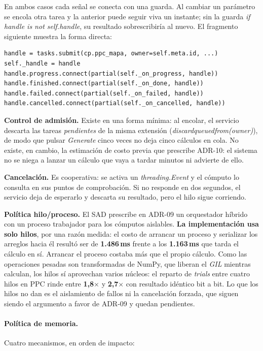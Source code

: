 \documentclass[12pt,letterpaper,oneside]{article}
\DeclareRobustCommand{\_}{\textunderscore\allowbreak}
\begin{document}
En ambos casos cada señal se conecta con una guarda. Al cambiar un parámetro se encola otra tarea y la anterior puede seguir viva un instante; sin la guarda \textit{if handle is not self.\_handle}, su resultado sobrescribiría al nuevo. El fragmento siguiente muestra la forma directa:

\begin{verbatim}
handle = tasks.submit(cp.ppc_mapa, owner=self.meta.id, ...)
self._handle = handle
handle.progress.connect(partial(self._on_progress, handle))
handle.finished.connect(partial(self._on_done, handle))
handle.failed.connect(partial(self._on_failed, handle))
handle.cancelled.connect(partial(self._on_cancelled, handle))
\end{verbatim}

\textbf{Control de admisión.} Existe en una forma mínima: al encolar, el servicio descarta las tareas \textit{pendientes} de la misma extensión (\textit{\textunderscore{}discard\_queued\_from(owner)}), de modo que pulsar \textit{Generate} cinco veces no deja cinco cálculos en cola. No existe, en cambio, la estimación de costo previa que prescribe ADR-10: el sistema no se niega a lanzar un cálculo que vaya a tardar minutos ni advierte de ello.

\textbf{Cancelación.} Es cooperativa: se activa un \textit{threading.Event} y el cómputo lo consulta en sus puntos de comprobación. Si no responde en dos segundos, el servicio deja de esperarlo y descarta su resultado, pero el hilo sigue corriendo.

\textbf{Política hilo/proceso.} El SAD prescribe en ADR-09 un orquestador híbrido con un proceso trabajador para los cómputos aislables. \textbf{La implementación usa solo hilos}, por una razón medida: el costo de arrancar un proceso y serializar los arreglos hacia él resultó ser de \textbf{1.486\,ms} frente a los \textbf{1.163\,ms} que tarda el cálculo en sí. Arrancar el proceso costaba más que el propio cálculo. Como las operaciones pesadas son transformadas de NumPy, que liberan el \textit{GIL} mientras calculan, los hilos sí aprovechan varios núcleos: el reparto de \textit{trials} entre cuatro hilos en PPC rinde entre \textbf{1,8$\times$} y \textbf{2,7$\times$} con resultado idéntico bit a bit. Lo que los hilos no dan es el aislamiento de fallos ni la cancelación forzada, que siguen siendo el argumento a favor de ADR-09 y quedan pendientes.

\paragraph{Política de memoria.} Cuatro mecanismos, en orden de impacto:
\end{document}
